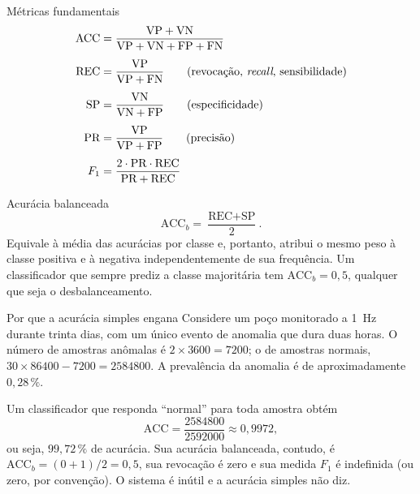 \begin{definicao}{Métricas fundamentais}
\begin{align}
\text{ACC} &= \frac{\text{VP} + \text{VN}}{\text{VP} + \text{VN} + \text{FP} + \text{FN}}
  \label{eq:acc}\\[0.4em]
\text{REC} &= \frac{\text{VP}}{\text{VP} + \text{FN}}
  \qquad \text{(revocação, \emph{recall}, sensibilidade)} \label{eq:rec}\\[0.4em]
\text{SP} &= \frac{\text{VN}}{\text{VN} + \text{FP}}
  \qquad \text{(especificidade)} \label{eq:sp}\\[0.4em]
\text{PR} &= \frac{\text{VP}}{\text{VP} + \text{FP}}
  \qquad \text{(precisão)} \label{eq:pr}\\[0.4em]
F_1 &= \frac{2 \cdot \text{PR} \cdot \text{REC}}{\text{PR} + \text{REC}}
  \label{eq:f1}
\end{align}
\end{definicao}

\begin{definicao}{Acurácia balanceada}
\begin{equation}
  \text{ACC}_b = \frac{\text{REC} + \text{SP}}{2}.
  \label{eq:accb}
\end{equation}
Equivale à média das acurácias por classe e, portanto, atribui o mesmo peso à classe
positiva e à negativa independentemente de sua frequência. Um classificador que sempre
prediz a classe majoritária tem $\text{ACC}_b = 0{,}5$, qualquer que seja o
desbalanceamento.
\end{definicao}

\begin{exemplo}{Por que a acurácia simples engana}
Considere um poço monitorado a \SI{1}{\hertz} durante trinta dias, com um único evento
de anomalia que dura duas horas. O número de amostras anômalas é
$2 \times 3600 = \num{7200}$; o de amostras normais, $30 \times 86400 - 7200 =
\num{2584800}$. A prevalência da anomalia é de aproximadamente $0{,}28\,\%$.

Um classificador que responda ``normal'' para toda amostra obtém
\[
  \text{ACC} = \frac{\num{2584800}}{\num{2592000}} \approx 0{,}9972,
\]
ou seja, $99{,}72\,\%$ de acurácia. Sua acurácia balanceada, contudo, é
$\text{ACC}_b = (0 + 1)/2 = 0{,}5$, sua revocação é zero e sua medida $F_1$ é
indefinida (ou zero, por convenção). O sistema é inútil e a acurácia simples não diz.
\end{exemplo}


